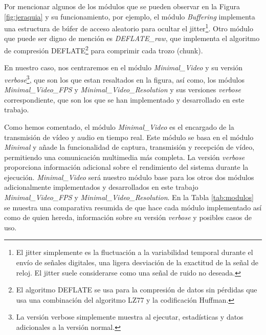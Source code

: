 Por mencionar algunos de los módulos que se pueden observar en la Figura \ref{fig:jeraquia} y su funcionamiento, por ejemplo, el módulo \textit{Buffering} implementa una estructura de búfer de acceso aleatorio para ocultar el jitter\footnote{El jitter simplemente es la fluctuación a la variabilidad temporal durante el envío de señales digitales, una ligera desviación de la exactitud de la señal de reloj. El jitter suele considerarse como una señal de ruido no deseada.}. Otro módulo que puede ser digno de mención es \textit{DEFLATE\_raw}, que implementa el algoritmo de compresión DEFLATE\footnote{El algoritmo DEFLATE se usa para la compresión de datos sin pérdidas que usa una combinación del algoritmo LZ77 y la codificación Huffman.} para comprimir cada trozo (chunk).

\vspace{\baselineskip}
En nuestro caso, nos centraremos en el módulo \textit{Minimal\_Video} y su versión \textit{verbose}\footnote{La versión verbose simplemente muestra al ejecutar, estadísticas y datos adicionales a la versión normal.}, que son los que estan resaltados en la figura, así como, los módulos \textit{Minimal\_Video\_FPS} y \textit{Minimal\_Video\_Resolution} y sus versiones \textit{verbose} correspondiente, que son los que se han implementado y desarrollado en este trabajo.

\vspace{\baselineskip}
Como hemos comentado, el módulo \textit{Minimal\_Video} es el encargado de la transmisión de vídeo y audio en tiempo real. Este módulo se basa en el módulo \textit{Minimal} y añade la funcionalidad de captura, transmisión y recepción de vídeo, permitiendo una comunicación multimedia más completa. La versión \textit{verbose} proporciona información adicional sobre el rendimiento del sistema durante la ejecución. \textit{Minimal\_Video} será nuestro módulo base para los otros dos módulos adicionalmente implementados y desarrollados en este trabajo \textit{Minimal\_Video\_FPS} y \textit{Minimal\_Video\_Resolution}. En la Tabla \ref{tab:modulos} se muestra una comparativa resumida de que hace cada módulo implementado así como de quien hereda, información sobre su versión \textit{verbose} y posibles casos de uso.

